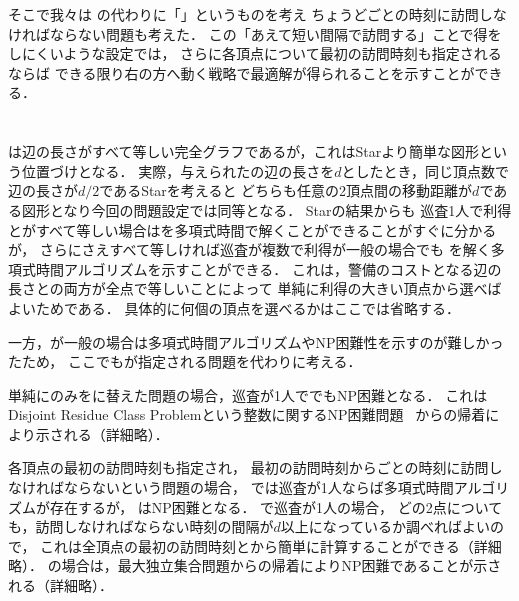 そこで我々は
{\timelimit}の代わりに「{\period}」というものを考え
{\period}ちょうどごとの時刻に訪問しなければならない問題も考えた．
この「あえて短い間隔で訪問する」ことで得をしにくいような設定では，
さらに各頂点について最初の訪問時刻も指定されるならば
できる限り右の方へ動く戦略で最適解が得られることを示すことができる．





\section{\comp}


{\comp}は辺の長さがすべて等しい完全グラフであるが，これはStarより簡単な図形という位置づけとなる．
実際，与えられた{\comp}の辺の長さを$d$としたとき，同じ頂点数で辺の長さが$d/2$であるStarを考えると
どちらも任意の2頂点間の移動距離が$d$である図形となり今回の問題設定では同等となる．
Starの結果から{\comp}も
巡査1人で利得と{\timelimit}がすべて等しい場合は{\optpp}を多項式時間で解くことができることがすぐに分かるが，
さらに{\timelimit}さえすべて等しければ巡査が複数で利得が一般の場合でも
{\optpp}を解く多項式時間アルゴリズムを示すことができる．
%
これは，警備のコストとなる辺の長さと{\timelimit}の両方が全点で等しいことによって
単純に利得の大きい頂点から選べばよいためである．
具体的に何個の頂点を選べるかはここでは省略する．



一方，{\timelimit}が一般の場合は多項式時間アルゴリズムやNP困難性を示すのが難しかったため，
ここでも{\period}が指定される問題を代わりに考える．

単純に{\timelimit}のみを{\period}に替えた問題の場合，巡査が1人で{\decisionpp}でもNP困難となる．
これは
Disjoint Residue Class Problemという整数に関するNP困難問題~\cite{kawamura2015simple}
からの帰着により示される（詳細略）．


各頂点の最初の訪問時刻も指定され，
最初の訪問時刻から{\period}ごとの時刻に訪問しなければならないという問題の場合，
%
\decisionpp では巡査が1人ならば多項式時間アルゴリズムが存在するが，
\optpp はNP困難となる．
%
{\decisionpp}で巡査が1人の場合，
どの2点についても，訪問しなければならない時刻の間隔が$d$以上になっているか調べればよいので，
これは全頂点の最初の訪問時刻と{\period}から簡単に計算することができる（詳細略）．
%
{\optpp}の場合は，最大独立集合問題からの帰着によりNP困難であることが示される（詳細略）．



